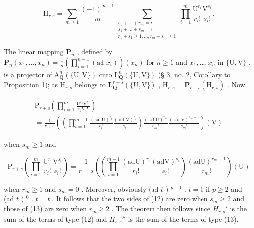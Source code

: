 \[
\mathrm{H}_{r,s} = \sum_{m\geqslant 1}\frac{(-1)^{m - 1}}{m}\sum_{\substack{r_{1} + \dots +r_{m} = r\\ s_{1} + \dots +s_{m} = s\\ r_{1} + s_{1}\geqslant 1,\ldots ,r_{m} + s_{m}\geqslant 1}}\prod_{i = 1}^{m}\frac{\mathrm{U}^{r_{i}}}{r_{i}!}\frac{\mathrm{V}^{s_{i}}}{s_{i}!}.\tag{11}
\]

The linear mapping \(\mathbf{P}_n\) , defined by \(\mathbf{P}_n(x_1, \ldots, x_n) = \frac{1}{n} \left( \prod_{i=1}^{n-1} (\text{ad } x_i) \right)(x_n)\) for \(n \geqslant 1\) and \(x_1, \ldots, x_n\) in \(\{\mathrm{U}, \mathrm{V}\}\) , is a projector of \(\mathrm{A}_{\mathbf{Q}}^n(\{\mathrm{U}, \mathrm{V}\})\) onto \(\mathrm{L}_{\mathbf{Q}}^n(\{\mathrm{U}, \mathrm{V}\})\) (§ 3, no. 2, Corollary to Proposition 1); as \(\mathrm{H}_{r,s}\) belongs to \(\mathbf{L}_{\mathbf{Q}}^{r+s}(\{\mathrm{U}, \mathrm{V}\})\) , \(\mathrm{H}_{r,s} = \mathbf{P}_{r+s}(\mathrm{H}_{r,s})\) . Now

\[
\begin{array}{l} \mathrm{P} _ {r + s} \left(\prod_ {i = 1} ^ {m} \frac {\mathrm{U} ^ {r _ {i}} \mathrm{V} ^ {s _ {i}}}{r _ {i} ! s _ {i} !}\right) \\ = \frac {1}{r + s} \left(\left(\prod_ {i = 1} ^ {m - 1} \frac {(\operatorname{ad} \mathrm{U}) ^ {r _ {i}}}{r _ {i} !} \frac {(\operatorname{ad} \mathrm{V}) ^ {s _ {i}}}{s _ {i} !}\right) \frac {(\operatorname{ad} \mathrm{U}) ^ {r _ {m}}}{r _ {m} !} \frac {(\operatorname{ad} \mathrm{V}) ^ {s _ {m} - 1}}{s _ {m} !}\right) (\mathrm{V}) \end{array}\tag{12}
\]

when \(s_m \geqslant 1\) and

\[
\mathrm{P} _ {r + s} \left(\prod_ {i = 1} ^ {m} \frac {\mathrm{U} ^ {r _ {i}}}{r _ {i} !} \frac {\mathrm{V} ^ {s _ {i}}}{s _ {i} !}\right) = \frac {1}{r + s} \left(\left(\prod_ {i = 1} ^ {m - 1} \frac {(\mathrm{adU}) ^ {r _ {i}}}{r _ {i} !} \frac {(\mathrm{adV}) ^ {s _ {i}}}{s _ {i} !}\right) \frac {(\mathrm{adU}) ^ {r _ {m} - 1}}{r _ {m} !}\right) (\mathrm{U})\tag{13}
\]

when \(r_m \geqslant 1\) and \(s_m = 0\) . Moreover, obviously (ad \(t\) ) \(^{p-1}\) . \(t = 0\) if \(p \geqslant 2\) and (ad \(t\) ) \(^0\) . \(t = t\) . It follows that the two sides of (12) are zero when \(s_m \geqslant 2\) and those of (13) are zero when \(r_m \geqslant 2\) . The theorem then follows since \(H_{r,s}'\) is the sum of the terms of type (12) and \(H_{r,s}''\) is the sum of the terms of type (13).

